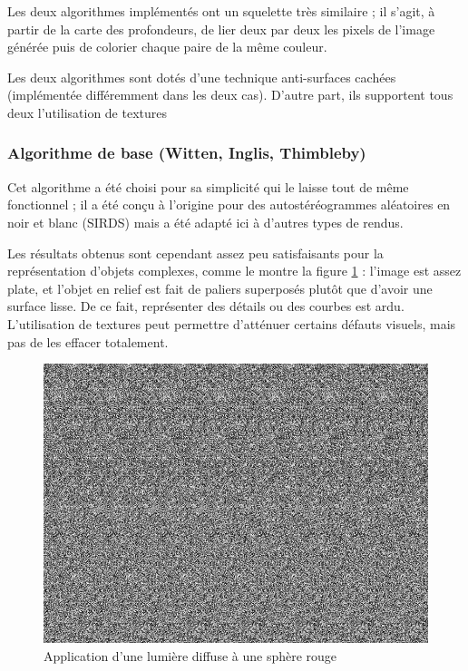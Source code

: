   Les deux algorithmes implémentés ont un squelette très similaire ; il s'agit, à partir de la carte des profondeurs, de lier deux par deux les pixels de l'image générée puis de colorier chaque paire de la même couleur.

  Les deux algorithmes sont dotés d'une technique anti-surfaces cachées (implémentée différemment dans les deux cas). D'autre part, ils supportent tous deux l'utilisation de textures 
  
  \subsubsection{Algorithme de base (Witten, Inglis, Thimbleby)}

  Cet algorithme a été choisi pour sa simplicité qui le laisse tout de même fonctionnel ; il a été conçu à l'origine pour des autostéréogrammes aléatoires en noir et blanc (SIRDS) mais a été adapté ici à d'autres types de rendus.

  Les résultats obtenus sont cependant assez peu satisfaisants pour la représentation d'objets complexes, comme le montre la figure \ref{fig:autoste1} : l'image est assez plate, et l'objet en relief est fait de paliers superposés plutôt que d'avoir une surface lisse. De ce fait, représenter des détails ou des courbes est ardu. L'utilisation de textures peut permettre d'atténuer certains défauts visuels, mais pas de les effacer totalement.

\begin{figure}[h]
	\centering
	\includegraphics[scale=0.3]{autoste1.png}
	\caption{\label{fig:autoste1} Application d’une lumière diffuse à une sphère rouge \protect}
\end{figure}

